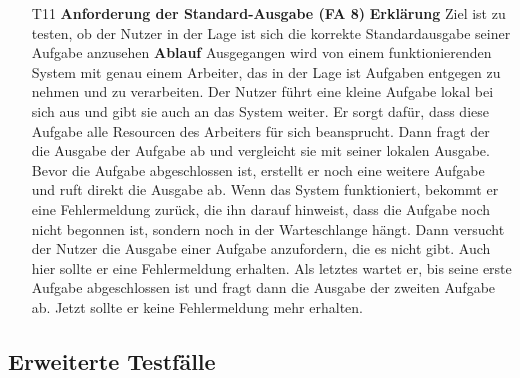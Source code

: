 \documentclass[a4paper,12pt]{article}
\begin{document}
\begin{itemize}
\item[T11] \textbf{Anforderung der Standard-Ausgabe (FA 8)}
\subitem \textbf{Erklärung} Ziel ist zu testen, ob der Nutzer in der Lage ist sich die korrekte Standardausgabe seiner Aufgabe anzusehen
\subitem \textbf{Ablauf} Ausgegangen wird von einem funktionierenden System mit genau einem Arbeiter, das in der Lage ist Aufgaben entgegen zu nehmen und zu verarbeiten.
Der Nutzer führt eine kleine Aufgabe lokal bei sich aus und gibt sie auch an das System weiter. Er sorgt dafür, dass diese Aufgabe alle Resourcen des Arbeiters für sich beansprucht.
Dann fragt der die Ausgabe der Aufgabe ab und vergleicht sie mit seiner lokalen Ausgabe.
Bevor die Aufgabe abgeschlossen ist, erstellt er noch eine weitere Aufgabe und ruft direkt die Ausgabe ab.
Wenn das System funktioniert, bekommt er eine Fehlermeldung zurück, die ihn darauf hinweist, dass die Aufgabe noch nicht begonnen ist, sondern noch in der Warteschlange hängt.
Dann versucht der Nutzer die Ausgabe einer Aufgabe anzufordern, die es nicht gibt. Auch hier sollte er eine Fehlermeldung erhalten.
Als letztes wartet er, bis seine erste Aufgabe abgeschlossen ist und fragt dann die Ausgabe der zweiten Aufgabe ab. Jetzt sollte er keine Fehlermeldung mehr erhalten.

\end{itemize}

\subsection{Erweiterte Testfälle}
\end{document}
